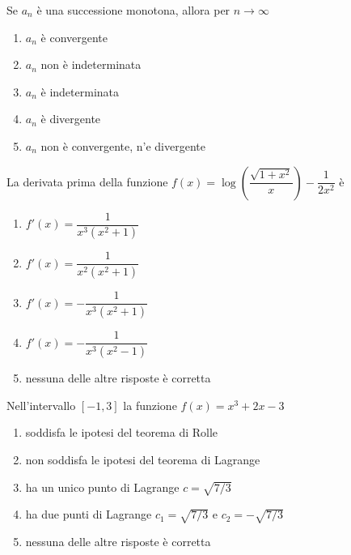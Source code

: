 \begin{quiz}
Se $a_n$ \`e una successione monotona, allora per $n\to\infty$
\begin{enumerate}
\item $a_n$ \`e convergente
\item $a_n$ non \`e indeterminata
\item $a_n$ \`e indeterminata
\item $a_n$ \`e divergente
\item $a_n$ non \`e convergente, n'e divergente
\end{enumerate}
\end{quiz}

\begin{quiz}
La derivata prima della funzione $f(x)=\log\!\left(\dfrac{\sqrt{1+x^2}}{x}\right)-\dfrac{1}{2x^2}$ \`e
\begin{enumerate}
\item $f'(x)=\dfrac{1}{x^3(x^2+1)}$
\item $f'(x)=\dfrac{1}{x^2(x^2+1)}$
\item $f'(x)=-\dfrac{1}{x^3(x^2+1)}$
\item $f'(x)=-\dfrac{1}{x^3(x^2-1)}$
\item nessuna delle altre risposte \`e corretta
\end{enumerate}
\end{quiz}

\begin{quiz}
Nell'intervallo $[-1,3]$ la funzione $f(x)=x^3+2x-3$
\begin{enumerate}
\item soddisfa le ipotesi del teorema di Rolle
\item non soddisfa le ipotesi del teorema di Lagrange
\item ha un unico punto di Lagrange $c=\sqrt{7/3}$
\item ha due punti di Lagrange $c_1=\sqrt{7/3}$ e $c_2=-\sqrt{7/3}$
\item nessuna delle altre risposte \`e corretta
\end{enumerate}
\end{quiz}

